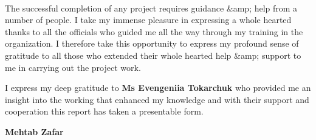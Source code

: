 \newpage
\thispagestyle{empty}

\begin{center}
\\[1.5cm]
\begin{flushleft}
The successful completion of any project requires guidance &amp; help from a number of
people. I take my immense pleasure in expressing a whole hearted thanks to all the
officials who guided me all the way through my training in the organization. I
therefore take this opportunity to express my profound sense of gratitude to all those
who extended their whole hearted help &amp; support to me in carrying out the project
work.

\setlength{\parindent}{3ex} 
I express my deep gratitude to \textbf{Ms Evengeniia Tokarchuk} who provided me an insight into the working that enhanced my knowledge and with their support and cooperation this report has taken a presentable form.
\end{flushleft}
\vfill
\begin{flushright}
\textbf{Mehtab Zafar}\\
\end{flushright}

\end{center}

\vfill